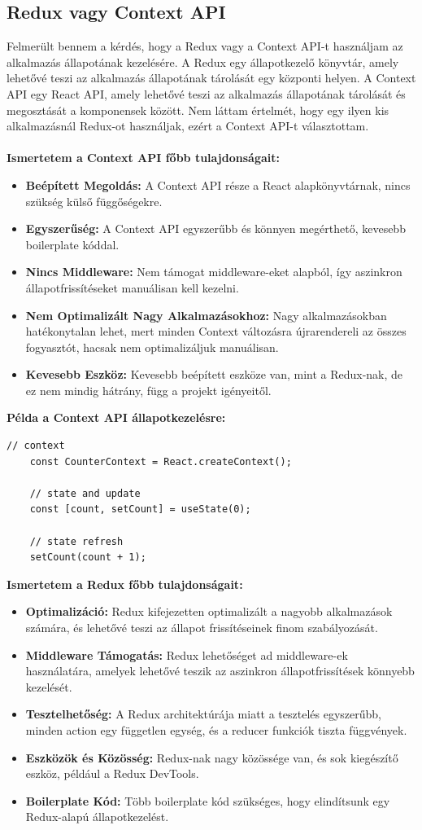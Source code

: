 \subsection*{Redux vagy Context API}
Felmerült bennem a kérdés, hogy a Redux vagy a Context API-t használjam az alkalmazás állapotának kezelésére.
A Redux egy állapotkezelő könyvtár, amely lehetővé teszi az alkalmazás állapotának tárolását egy központi helyen.
A Context API egy React API, amely lehetővé teszi az alkalmazás állapotának tárolását és megosztását a komponensek között.
Nem láttam értelmét, hogy egy ilyen kis alkalmazásnál Redux-ot használjak, ezért a Context API-t választottam.
\\
\\
\textbf{Ismertetem a Context API főbb tulajdonságait:}
\begin{itemize}
    \item \textbf{Beépített Megoldás:} A Context API része a React alapkönyvtárnak, nincs szükség külső függőségekre.
    \item \textbf{Egyszerűség:} A Context API egyszerűbb és könnyen megérthető, kevesebb boilerplate kóddal.
    \item \textbf{Nincs Middleware:} Nem támogat middleware-eket alapból, így aszinkron állapotfrissítéseket manuálisan kell kezelni.
    \item \textbf{Nem Optimalizált Nagy Alkalmazásokhoz:} Nagy alkalmazásokban hatékonytalan lehet, mert minden Context változásra újrarendereli az összes fogyasztót, hacsak nem optimalizáljuk manuálisan.
    \item \textbf{Kevesebb Eszköz:} Kevesebb beépített eszköze van, mint a Redux-nak, de ez nem mindig hátrány, függ a projekt igényeitől.
\end{itemize}
\textbf{Példa a Context API állapotkezelésre:}
\begin{lstlisting}[style=es6, morekeywords={document, P5, katex}]
    // context
    const CounterContext = React.createContext();
    
    // state and update
    const [count, setCount] = useState(0);
    
    // state refresh
    setCount(count + 1);
\end{lstlisting}
\textbf{Ismertetem a Redux főbb tulajdonságait:}
\begin{itemize}
    \item \textbf{Optimalizáció:} Redux kifejezetten optimalizált a nagyobb alkalmazások számára, és lehetővé teszi az állapot frissítéseinek finom szabályozását.
    \item \textbf{Middleware Támogatás:} Redux lehetőséget ad middleware-ek használatára, amelyek lehetővé teszik az aszinkron állapotfrissítések könnyebb kezelését.
    \item \textbf{Tesztelhetőség:} A Redux architektúrája miatt a tesztelés egyszerűbb, minden action egy független egység, és a reducer funkciók tiszta függvények.
    \item \textbf{Eszközök és Közösség:} Redux-nak nagy közössége van, és sok kiegészítő eszköz, például a Redux DevTools.
    \item \textbf{Boilerplate Kód:} Több boilerplate kód szükséges, hogy elindítsunk egy Redux-alapú állapotkezelést.
\end{itemize}
